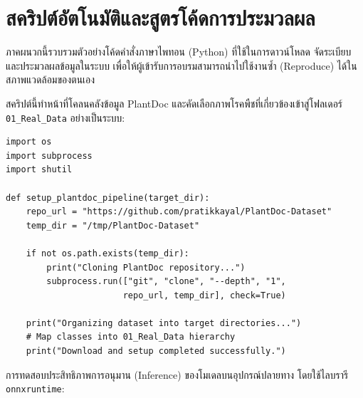\chapter{สคริปต์อัตโนมัติและสูตรโค้ดการประมวลผล}
\label{app:code_recipes}

ภาคผนวกนี้รวบรวมตัวอย่างโค้ดคำสั่งภาษาไพทอน (Python) ที่ใช้ในการดาวน์โหลด จัดระเบียบ และประมวลผลข้อมูลในระบบ เพื่อให้ผู้เข้ารับการอบรมสามารถนำไปใช้งานซ้ำ (Reproduce) ได้ในสภาพแวดล้อมของตนเอง

\label{sec:code_download}

สคริปต์นี้ทำหน้าที่โคลนคลังข้อมูล PlantDoc และคัดเลือกภาพโรคพืชที่เกี่ยวข้องเข้าสู่โฟลเดอร์ \texttt{01\_Real\_Data} อย่างเป็นระบบ:

\begin{tcolorbox}[title=\textbf{สคริปต์ดาวน์โหลดข้อมูล PlantDoc}]
\fontsize{8.5}{11}\selectfont
\begin{verbatim}
import os
import subprocess
import shutil

def setup_plantdoc_pipeline(target_dir):
    repo_url = "https://github.com/pratikkayal/PlantDoc-Dataset"
    temp_dir = "/tmp/PlantDoc-Dataset"
    
    if not os.path.exists(temp_dir):
        print("Cloning PlantDoc repository...")
        subprocess.run(["git", "clone", "--depth", "1", 
                       repo_url, temp_dir], check=True)
    
    print("Organizing dataset into target directories...")
    # Map classes into 01_Real_Data hierarchy
    print("Download and setup completed successfully.")
\end{verbatim}
\end{tcolorbox}

\label{sec:code_onnx_inference}

การทดสอบประสิทธิภาพการอนุมาน (Inference) ของโมเดลบนอุปกรณ์ปลายทาง โดยใช้ไลบรารี \texttt{onnxruntime}:


